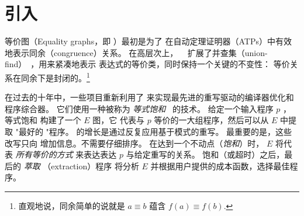 \section{引入}
\label{sec:intro}


等价图（Equality graphs，即 \egraph）最初是为了
  在自动定理证明器（ATPs）中有效地表示同余（congruence）关系。
在高层次上， \egraphs~\cite{nelson, pp-congr} 
  扩展了并查集（union-find）~\cite{unionfind}，用来紧凑地表示
  表达式的等价类，同时保持一个关键的不变性：
  等价关系在同余下是封闭的。\footnote{
    直观地说，同余简单的说就是
    $a \equiv b$ 蕴含 $f(a) \equiv f(b)$.}

    
在过去的十年中，一些项目重新利用了 \egraphs
  来实现最先进的重写驱动的编译器优化和程序综合器。
  它们使用一种被称为 \textit{等式饱和}~\cite{
    denali, eqsat, eqsat-llvm, szalinski, yogo-pldi20, spores, herbie} 的技术。
给定一个输入程序 $p$ ，
  等式饱和 构建了一个 $E$ 图，它
  代表与 $p$ 等价的一大组程序，然后可以从 $E$ 中提取 "最好的 "程序。
\egraph 的增长是通过反复应用基于模式的重写。
最重要的是，这些改写只向 \egraph 增加信息。不需要仔细排序。
在达到一个不动点（\textit{饱和}）时，
  $E$ 将代表 \textit{所有等价的方式} 来表达表达 $p$ 与给定重写的关系。
饱和（或超时）之后，最后的 \textit{萃取} （extraction）程序
  将分析 $E$ 并根据用户提供的成本函数，选择最佳程序。



